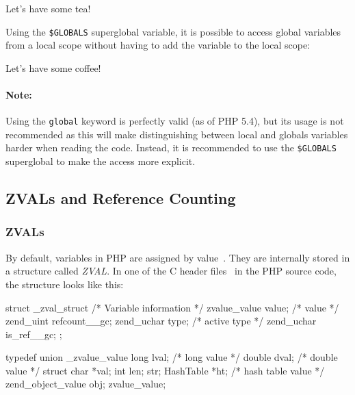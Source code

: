 \begin{textcode}
Let's have some tea!
\end{textcode}

Using the \texttt{\$GLOBALS} superglobal variable, it is possible to access global variables from a local scope without having to add the variable to the local scope:


\begin{textcode}
Let's have some coffee!
\end{textcode}

\paragraph{Note:} Using the \texttt{global} keyword is perfectly valid (as of PHP 5.4), but its usage is not recommended as this will make distinguishing between local and globals variables harder when reading the code. Instead, it is recommended to use the \texttt{\$GLOBALS} superglobal to make the access more explicit. ~\cite{typo3-cgl-php-syntax-formatting}



\subsection{ZVALs and Reference Counting}


\subsubsection{ZVALs}
\label{sec:zvals}

By default, variables in PHP are assigned by value~\cite{php-manual-variables}. They are internally stored in a structure called \emph{ZVAL}. In one of the C header files~\cite{php-src-api-headers} in the PHP source code, the structure looks like this:

\begin{ccode}
struct _zval_struct {
  /* Variable information */
  zvalue_value value;       /* value */
  zend_uint refcount__gc;
  zend_uchar type;          /* active type */
  zend_uchar is_ref__gc;
};

typedef union _zvalue_value {
  long lval;     /* long value */
  double dval;   /* double value */
  struct {
    char *val;
    int len;
  } str;
  HashTable *ht;  /* hash table value */
  zend_object_value obj;
} zvalue_value;
\end{ccode}

